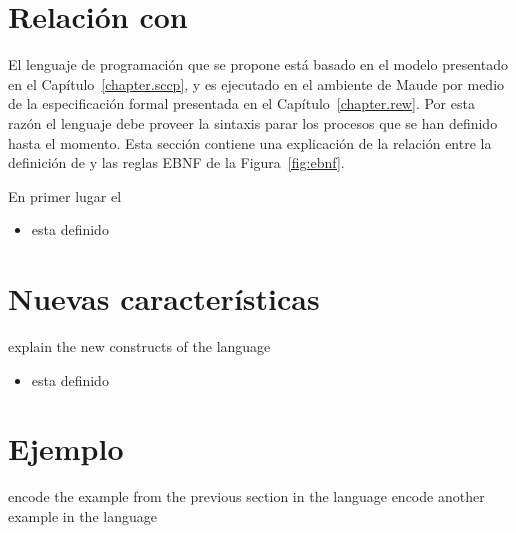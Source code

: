 \section{Relaci\'on con \SCCP}
\label{sccp.lang}

El lenguaje de programaci\'on que se propone est\'a basado en el modelo \SCCP presentado en el Cap\'itulo~\ref{chapter.sccp}, y es ejecutado en el ambiente de Maude por medio de la especificaci\'on formal presentada en el Cap\'itulo~\ref{chapter.rew}. Por esta raz\'on el lenguaje debe proveer la sintaxis parar los procesos que se han definido hasta el momento. Esta secci\'on contiene una explicaci\'on de la relaci\'on entre la definici\'on de \SCCP y las reglas EBNF de la Figura~\ref{fig:ebnf}.

En primer lugar el 

\begin{itemize}
\item {} esta definido
\end{itemize}


\section{Nuevas caracter\'isticas}
\label{new.lang}

explain the new constructs of the language

\begin{itemize}
\item {} esta definido
\end{itemize}


\section{Ejemplo}
\label{example.lang}

encode the example from the previous section in the language
encode another example in the language
